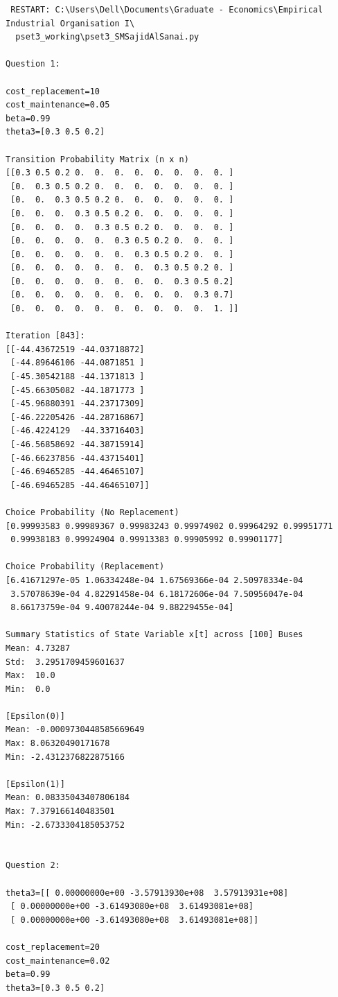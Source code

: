 \documentclass{article}
\begin{document}
\begin{lstlisting}
 RESTART: C:\Users\Dell\Documents\Graduate - Economics\Empirical Industrial Organisation I\
  pset3_working\pset3_SMSajidAlSanai.py 

Question 1:

cost_replacement=10
cost_maintenance=0.05
beta=0.99
theta3=[0.3 0.5 0.2]

Transition Probability Matrix (n x n)
[[0.3 0.5 0.2 0.  0.  0.  0.  0.  0.  0.  0. ]
 [0.  0.3 0.5 0.2 0.  0.  0.  0.  0.  0.  0. ]
 [0.  0.  0.3 0.5 0.2 0.  0.  0.  0.  0.  0. ]
 [0.  0.  0.  0.3 0.5 0.2 0.  0.  0.  0.  0. ]
 [0.  0.  0.  0.  0.3 0.5 0.2 0.  0.  0.  0. ]
 [0.  0.  0.  0.  0.  0.3 0.5 0.2 0.  0.  0. ]
 [0.  0.  0.  0.  0.  0.  0.3 0.5 0.2 0.  0. ]
 [0.  0.  0.  0.  0.  0.  0.  0.3 0.5 0.2 0. ]
 [0.  0.  0.  0.  0.  0.  0.  0.  0.3 0.5 0.2]
 [0.  0.  0.  0.  0.  0.  0.  0.  0.  0.3 0.7]
 [0.  0.  0.  0.  0.  0.  0.  0.  0.  0.  1. ]]

Iteration [843]:
[[-44.43672519 -44.03718872]
 [-44.89646106 -44.0871851 ]
 [-45.30542188 -44.1371813 ]
 [-45.66305082 -44.1871773 ]
 [-45.96880391 -44.23717309]
 [-46.22205426 -44.28716867]
 [-46.4224129  -44.33716403]
 [-46.56858692 -44.38715914]
 [-46.66237856 -44.43715401]
 [-46.69465285 -44.46465107]
 [-46.69465285 -44.46465107]]

Choice Probability (No Replacement)
[0.99993583 0.99989367 0.99983243 0.99974902 0.99964292 0.99951771
 0.99938183 0.99924904 0.99913383 0.99905992 0.99901177]

Choice Probability (Replacement)
[6.41671297e-05 1.06334248e-04 1.67569366e-04 2.50978334e-04
 3.57078639e-04 4.82291458e-04 6.18172606e-04 7.50956047e-04
 8.66173759e-04 9.40078244e-04 9.88229455e-04]

Summary Statistics of State Variable x[t] across [100] Buses
Mean: 4.73287
Std:  3.2951709459601637
Max:  10.0
Min:  0.0

[Epsilon(0)]
Mean: -0.0009730448585669649
Max: 8.06320490171678
Min: -2.4312376822875166

[Epsilon(1)]
Mean: 0.08335043407806184
Max: 7.379166140483501
Min: -2.6733304185053752


Question 2:

theta3=[[ 0.00000000e+00 -3.57913930e+08  3.57913931e+08]
 [ 0.00000000e+00 -3.61493080e+08  3.61493081e+08]
 [ 0.00000000e+00 -3.61493080e+08  3.61493081e+08]]

cost_replacement=20
cost_maintenance=0.02
beta=0.99
theta3=[0.3 0.5 0.2]


\end{lstlisting}
\end{document}
